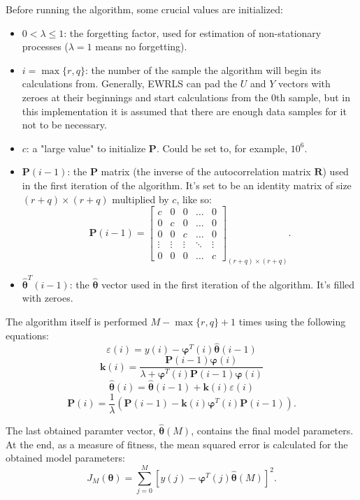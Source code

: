 \documentclass[12pt,a4paper]{article}
\begin{document}
Before running the algorithm, some crucial values are initialized:
\begin{itemize}
\item $0 < \lambda \leq 1$: the forgetting factor, used for estimation of non-stationary processes ($\lambda = 1$ means no forgetting).
\item $i = \max \{ r,q \}$: the number of the sample the algorithm will begin its calculations from. Generally, EWRLS can pad the $U$ and $Y$ vectors with zeroes at their beginnings and start calculations from the 0th sample, but in this implementation it is assumed that there are enough data samples for it not to be necessary.
\item $c$: a "large value" to initialize $\bm{P}$. Could be set to, for example, $10^{6}$.
\item $\bm{P}(i-1)$: the $\bm{P}$ matrix (the inverse of the autocorrelation matrix $\bm{R}$) used in the first iteration of the algorithm. It's set to be an identity matrix of size $(r+q) \times (r+q)$ multiplied by $c$, like so:
\begin{equation*}
\bm{P}(i-1) = \begin{bmatrix}
	c      & 0      & 0      & \dots  & 0 \\
	0      & c      & 0      & \dots  & 0 \\
	0      & 0      & c      & \dots  & 0 \\
	\vdots & \vdots & \vdots & \ddots & \vdots \\
	0      & 0      & 0      & \dots  & c 
\end{bmatrix}_{(r+q) \times (r+q)} \text{.}
\end{equation*}
\item $\hat{\bm{\theta}}^{T}(i-1)$: the $\hat{\bm{\theta}}$ vector used in the first iteration of the algorithm. It's filled with zeroes.
\end{itemize}

The algorithm itself is performed $M-\max \{ r,q \}+1$ times using the following equations:
\begin{equation*}
\varepsilon(i) = y(i)-\bm{\varphi}^{T}(i)\hat{\bm{\theta}}(i-1)
\end{equation*}
\begin{equation*}
\bm{k}(i) = \frac{\bm{P}(i-1)\bm{\varphi}(i)}{\lambda+\bm{\varphi}^{T}(i)\bm{P}(i-1)\bm{\varphi}(i)}
\end{equation*}
\begin{equation*}
\hat{\bm{\theta}}(i) = \hat{\bm{\theta}}(i-1) + \bm{k}(i)\varepsilon(i)
\end{equation*}
\begin{equation*}
\bm{P}(i) = \frac{1}{\lambda} \left(\bm{P}(i-1) - \bm{k}(i)\bm{\varphi}^{T}(i)\bm{P}(i-1) \right) \text{.}
\end{equation*}

The last obtained paramter vector, $\hat{\bm{\theta}}(M)$, contains the final model parameters. At the end, as a measure of fitness, the mean squared error is calculated for the obtained model parameters: 
\begin{equation*}
J_{M}(\bm{\theta}) = \sum_{j=0}^{M} \left[ y(j)-\bm{\varphi}^{T}(j)\hat{\bm{\theta}}(M) \right]^{2} \text{.}
\end{equation*}
\end{document}
